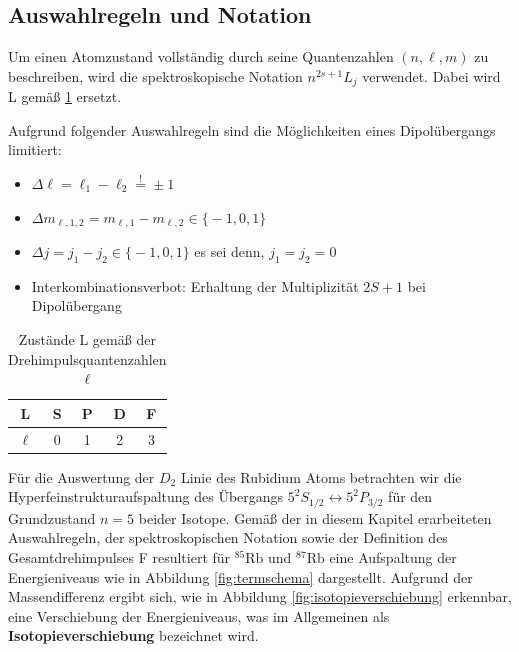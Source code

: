 \subsection{Auswahlregeln und Notation}

\noindent Um einen Atomzustand vollständig durch seine Quantenzahlen $(n,\ell,m)$ zu beschreiben, wird die spektroskopische Notation $n^{2s+1}L_{j}$ verwendet. Dabei wird L gemäß \ref{tab:Atomzustände} ersetzt.

\noindent Aufgrund folgender Auswahlregeln sind die Möglichkeiten eines Dipolübergangs limitiert:
\begin{multicols}{2}
\begin{itemize}
    \item $\Delta \ell = \ell_{1} - \ell_{2} \overset{!}{=} \pm 1$
    \item  $\Delta m_{\ell,1,2} = m_{\ell,1} - m_{\ell,2} \in \bigl\{-1,0, 1\bigr\}$ \\
    \item $\Delta j = j_{1} - j_{2} \in \bigl\{-1, 0, 1\bigr\}$ es sei denn, $j_{1} = j_{2} = 0$
    \item Interkombinationsverbot: Erhaltung der Multiplizität $2S+1$ bei Dipolübergang
\end{itemize}
\end{multicols}

\begin{table}[h]
    \centering
    \begin{tabular}{c|cccc}
         L &S &P &D &F \\
         \hline
         $\ell$ &0 &1 &2 &3\\
    \end{tabular}
    \caption{Zustände L gemäß der Drehimpulsquantenzahlen $\ell$}
    \label{tab:Atomzustände}
\end{table}

\noindent Für die Auswertung der $D_{2}$ Linie des Rubidium Atoms betrachten wir die Hyperfeinstrukturaufspaltung des Übergangs $5^{2}S_{1/2} \leftrightarrow 5^{2}P_{3/2}$ für den Grundzustand $n=5$ beider Isotope. Gemäß der in diesem Kapitel erarbeiteten Auswahlregeln, der spektroskopischen Notation sowie der Definition des Gesamtdrehimpulses F resultiert für $^{85}\text{Rb}$ und $^{87}\text{Rb}$ eine Aufspaltung der Energieniveaus wie in Abbildung \ref{fig:termschema} dargestellt. Aufgrund der Massendifferenz ergibt sich, wie in Abbildung \ref{fig:isotopieverschiebung} erkennbar, eine Verschiebung der Energieniveaus, was im Allgemeinen als \textbf{Isotopieverschiebung} bezeichnet wird. 

